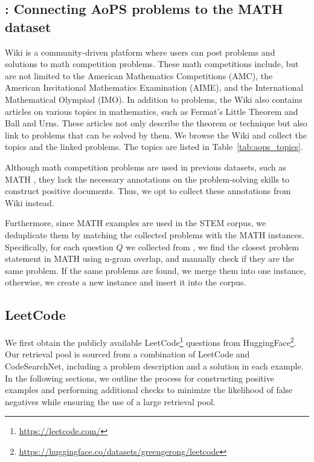 \subsection{\aops: Connecting AoPS problems to the MATH dataset}
\label{app:aops}
\aops Wiki is a community-driven platform where users can post problems and solutions to math competition problems.
These math competitions include, but are not limited to the American Mathematics Competitions (AMC), the American Invitational Mathematics Examination (AIME), and the International Mathematical Olympiad (IMO).
In addition to problems, the \aops Wiki also contains articles on various topics in mathematics, such as Fermat's Little Theorem and Ball and Urns.
These articles not only describe the theorem or technique but also link to problems that can be solved by them.
We browse the \aops Wiki and collect the topics and the linked problems.
The topics are listed in Table~\ref{tab:aops_topics}.

Although math competition problems are used in previous datasets, such as MATH \citep{hendrycks2021measuring}, they lack the necessary annotations on the problem-solving skills to construct positive documents.
Thus, we opt to collect these annotations from \aops Wiki instead.

Furthermore, since MATH examples are used in the STEM corpus, we deduplicate them by matching the collected problems with the MATH instances.
Specifically, for each question $Q$ we collected from \aops, we find the closest problem statement in MATH using n-gram overlap, and manually check if they are the same problem. 
If the same problems are found, we merge them into one instance, otherwise, we create a new instance and insert it into the corpus.




\subsection{LeetCode}
\label{app:data:leetcode}
 We first obtain the publicly available LeetCode\footnote{\url{https://leetcode.com/}} questions from HuggingFace\footnote{\url{https://huggingface.co/datasets/greengerong/leetcode}}. Our retrieval pool is sourced from a combination of LeetCode and CodeSearchNet, including a problem description and a solution in each example. In the following sections, we outline the process for constructing positive examples and performing additional checks to minimize the likelihood of false negatives while ensuring the use of a large retrieval pool.
 

